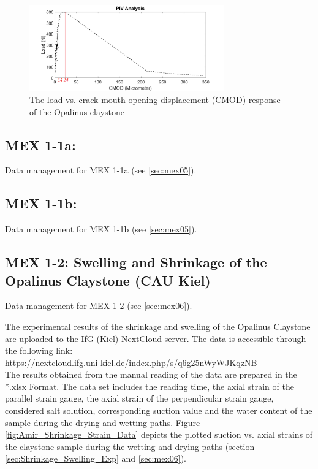 \begin{figure}[!ht]
\centering
\includegraphics[width=0.75\textwidth]{figures/Amir_Fracture_Toughness_Result_20_Data.png}
\caption{The load vs. crack mouth opening displacement (CMOD) response of the Opalinus claystone}
\label{fig:Amir_Fracture_Toughness_Result_20_Data}
\end{figure}

\subsection{MEX 1-1a:}

Data management for MEX 1-1a (see \ref{sec:mex05}).

\subsection{MEX 1-1b:}

Data management for MEX 1-1b (see \ref{sec:mex05}).

\subsection{MEX 1-2: Swelling and Shrinkage of the Opalinus Claystone (CAU Kiel)}

Data management for MEX 1-2 (see \ref{sec:mex06}).

The experimental results of the shrinkage and swelling of the Opalinus Claystone are uploaded to the IfG (Kiel) NextCloud server. The data is accessible through the following link:\\
\hyperlink{https://nextcloud.ifg.uni-kiel.de/index.php/s/q6g25nWyWJKqzNB}{https://nextcloud.ifg.uni-kiel.de/index.php/s/q6g25nWyWJKqzNB}\\

The results obtained from the manual reading of the data are prepared in the *.xlsx Format. The data set includes the reading time, the axial strain of the parallel strain gauge, the axial strain of the perpendicular strain gauge, considered salt solution, corresponding suction value and the water content of the sample during the drying and wetting paths. Figure \ref{fig:Amir_Shrinkage_Strain_Data} depicts the plotted suction vs. axial strains of the claystone sample during the wetting and drying paths (section \ref{sec:Shrinkage_Swelling_Exp} and \ref{sec:mex06}).


